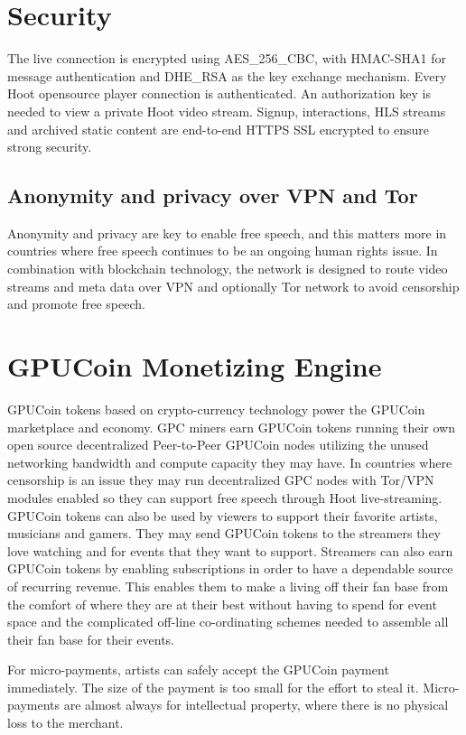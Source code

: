 \documentclass{article}
\begin{document}
\section{Security}
The live connection is encrypted using AES\_256\_CBC, with HMAC-SHA1 for message authentication and DHE\_RSA as the key exchange mechanism. Every Hoot opensource player connection is authenticated.
An authorization key is needed to view a private Hoot video stream. Signup, interactions, HLS streams and archived static content are end-to-end HTTPS SSL encrypted to ensure strong security. 

\subsection{Anonymity and privacy over VPN and Tor}
Anonymity and privacy are key to enable free speech, and this matters more in countries where free speech continues to be an ongoing human rights issue. In combination with blockchain technology, the network is
designed to route video streams and meta data over VPN and optionally Tor network to avoid censorship and promote free speech.

\section{GPUCoin Monetizing Engine}
GPUCoin tokens based on crypto-currency technology power the GPUCoin marketplace and economy. GPC miners earn GPUCoin tokens running their own open source decentralized Peer-to-Peer GPUCoin nodes utilizing the unused networking bandwidth and compute capacity they may have. 
In countries where censorship is an issue they may run decentralized GPC nodes with Tor/VPN modules enabled so they can support free speech through Hoot live-streaming.
 GPUCoin tokens can also be used by viewers to support their favorite artists, musicians and gamers. They may send GPUCoin tokens to the streamers they love watching and for events that they want to support. Streamers can also earn GPUCoin tokens by enabling subscriptions in order to have a dependable source of recurring revenue. This enables them to make a living off their fan base from the comfort of where they are at their best without having to spend for event space and the complicated off-line co-ordinating schemes needed to assemble all their fan base for their events.

For micro-payments, artists can safely accept the GPUCoin payment immediately. The size of the payment is too small for the effort to steal it. Micro-payments are almost always for intellectual property, where there is no physical loss to the merchant.
\end{document}
